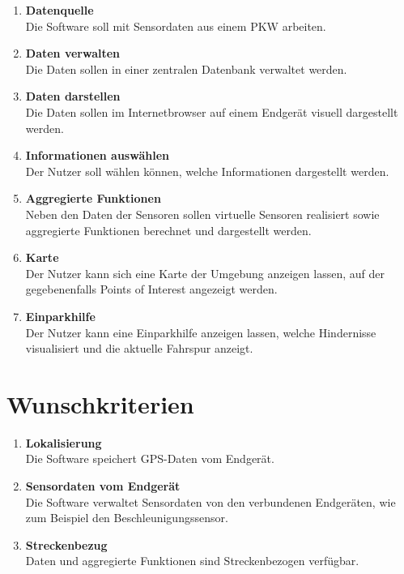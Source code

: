 \documentclass[pflichtenheft.tex]{subfiles}
\begin{document}
\begin{enumerate}

	\item{\textbf{Datenquelle}} \\Die Software soll mit Sensordaten aus einem PKW arbeiten.

	\item{\textbf{Daten verwalten}} \\Die Daten sollen in einer zentralen Datenbank verwaltet werden.

	\item{\textbf{Daten darstellen}} \\Die Daten sollen im Internetbrowser auf einem Endgerät visuell dargestellt werden.

	\item{\textbf{Informationen auswählen}} \\Der Nutzer soll wählen können, welche Informationen dargestellt werden.

	\item{\textbf{Aggregierte Funktionen}} \\Neben den Daten der Sensoren sollen virtuelle Sensoren realisiert sowie aggregierte Funktionen berechnet und dargestellt werden.

	\item{\textbf{Karte}} \\Der Nutzer kann sich eine Karte der Umgebung anzeigen lassen, auf der gegebenenfalls Points of Interest angezeigt werden.

	\item{\textbf{Einparkhilfe}} \\Der Nutzer kann eine Einparkhilfe anzeigen lassen, welche Hindernisse visualisiert und die aktuelle Fahrspur anzeigt.




\end{enumerate}

\renewcommand{\theenumi}{/WK\ifnum \value{enumi}<10 0\fi\arabic{enumi}0/}
\renewcommand{\labelenumi}{\theenumi}
\renewcommand{\theenumii}{\arabic{enumii}}
\renewcommand{\labelenumii}{/WK\ifnum \value{enumi}<10 0\fi\arabic{enumi}\arabic{enumii}/}
\section{Wunschkriterien}

\begin{enumerate}
	\item{\textbf{Lokalisierung}}\\Die Software speichert GPS-Daten vom Endgerät.

	\item{\textbf{Sensordaten vom Endgerät}}\\Die Software verwaltet Sensordaten von den verbundenen Endgeräten, wie zum Beispiel den Beschleunigungssensor.

	\item{\textbf{Streckenbezug}} \\Daten und aggregierte Funktionen sind Streckenbezogen verfügbar.

\end{enumerate}
\end{document}
